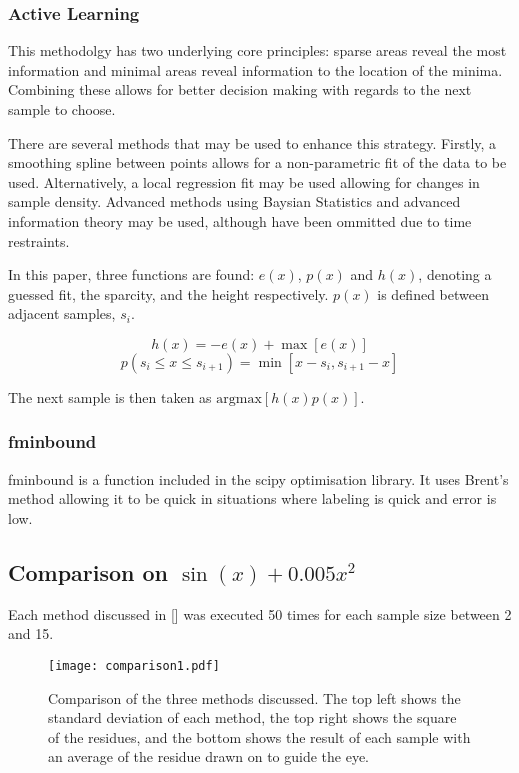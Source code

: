 \subsubsection{Active Learning}
This methodolgy has two underlying core principles: sparse areas reveal the most information and minimal areas reveal information to the location of the minima. Combining these allows for better decision making with regards to the next sample to choose.

There are several methods that may be used to enhance this strategy. Firstly, a smoothing spline between points allows for a non-parametric fit of the data to be used. Alternatively, a local regression fit may be used allowing for changes in sample density. Advanced methods using Baysian Statistics and advanced information theory may be used, although have been ommitted due to time restraints.

In this paper, three functions are found: $e(x)$, $p(x)$ and $h(x)$, denoting a guessed fit, the sparcity, and the height respectively. $p(x)$ is defined between adjacent samples, $s_i$.

\begin{equation}
  {h(x)=-e(x)+\max[e(x)]}
\end{equation}
\begin{equation}
  p(s_i \le x \le s_{i+1})=\min[x-s_i, s_{i+1}-x]
\end{equation}

The next sample is then taken as $\text{argmax}[h(x)p(x)]$.

\subsubsection{fminbound}
fminbound is a function included in the scipy optimisation library. It uses Brent's method allowing it to be quick in situations where labeling is quick and error is low.
\subsection[Comparison One]{Comparison on $\sin(x)+0.005x^2$}

Each method discussed in [] was executed 50 times for each sample size between 2 and 15. 

\begin{figure}[htbp!] 
  \centering    
  \texttt{[image: comparison1.pdf]}
  \caption[First Comparison]{Comparison of the three methods discussed. The top left shows the standard deviation of each method, the top right shows the square of the residues, and the bottom shows the result of each sample with an average of the residue drawn on to guide the eye.}
  \label{fig:firstComparison}
\end{figure}


